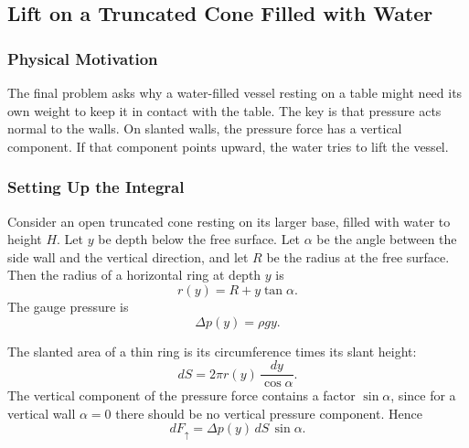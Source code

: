 \documentclass[../main.tex]{subfiles}
\begin{document}
\subsection{Lift on a Truncated Cone Filled with Water}\label{sec:lec11:truncated-cone}

\subsubsection*{Physical Motivation}
The final problem asks why a water-filled vessel resting on a table might need its own weight to keep it in contact with the table. The key is that pressure acts normal to the walls. On slanted walls, the pressure force has a vertical component. If that component points upward, the water tries to lift the vessel.

\subsubsection{Setting Up the Integral}\label{subsec:lec11:cone-setup}
Consider an open truncated cone resting on its larger base, filled with water to height $H$. Let $y$ be depth below the free surface. Let $\alpha$ be the angle between the side wall and the vertical direction, and let $R$ be the radius at the free surface. Then the radius of a horizontal ring at depth $y$ is
\begin{equation}
  r(y)=R+y\tan\alpha.
  \label{eq:lec11_cone_radius}
\end{equation}
The gauge pressure is
\begin{equation}
  \Delta p(y)=\rho g y.
  \label{eq:lec11_cone_gauge_pressure}
\end{equation}

The slanted area of a thin ring is its circumference times its slant height:
\begin{equation}
  dS=2\pi r(y)\,\frac{dy}{\cos\alpha}.
  \label{eq:lec11_cone_area_element}
\end{equation}
The vertical component of the pressure force contains a factor $\sin\alpha$, since for a vertical wall $\alpha=0$ there should be no vertical pressure component. Hence
\begin{equation}
  dF_{\uparrow}
  =
  \Delta p(y)\,dS\,\sin\alpha.
  \label{eq:lec11_cone_differential_lift}
\end{equation}
\end{document}
